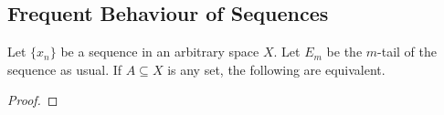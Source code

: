 \documentclass[../../main.tex]{subfiles}
\begin{document}
\providecommand{\xn}{\{x_n\}}
\subsection{Frequent Behaviour of Sequences}
\begin{wts}
    Let $\xn$ be a sequence in an arbitrary space $X$. Let $E_m$ be the $m$-tail of the sequence as usual. If $A\subseteq X$ is any set, the following are equivalent.
    \begin{enumalpha}
        
    \end{enumalpha}
\end{wts}
\begin{proof}

\end{proof}
\end{document}
